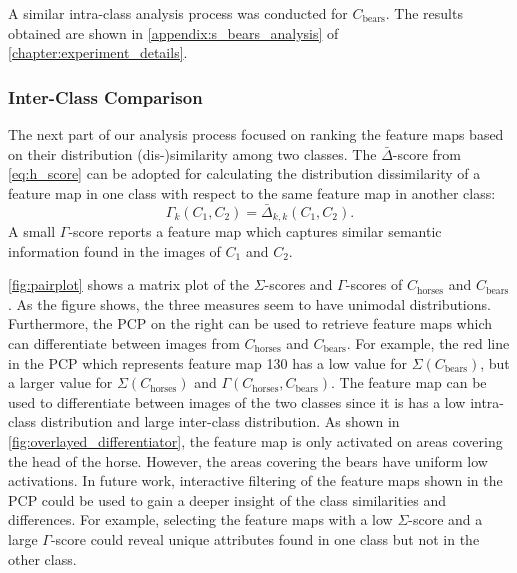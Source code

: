 A similar intra-class analysis process was conducted for $C_{\text{bears}}$. The results obtained are shown in \autoref{appendix:s_bears_analysis} of \autoref{chapter:experiment_details}.

\subsubsection{Inter-Class Comparison}

The next part of our analysis process focused on ranking the feature maps based on their distribution (dis-)similarity among two classes. The $\bar{\Delta}$-score from \autoref{eq:h_score} can be adopted for calculating the distribution dissimilarity of a feature map in one class with respect to the same feature map in another class:
\begin{equation}
    \Gamma_{k}(C_1, C_2) = \bar{\Delta}_{k, k}(C_1, C_2).
    \label{eq:F}
\end{equation}
A small $\Gamma$-score reports a feature map which captures similar semantic information found in the images of $C_1$ and $C_2$.

\autoref{fig:pairplot} shows a matrix plot of the $\Sigma$-scores and $\Gamma$-scores of $C_{\text{horses}}$ and $C_{\text{bears}}$. As the figure shows, the three measures seem to have unimodal distributions. Furthermore, the PCP on the right can be used to retrieve feature maps which can differentiate between images from $C_\text{horses}$ and $C_{\text{bears}}$. For example, the red line in the PCP which represents feature map 130 has a low value for $\Sigma(C_\text{bears})$, but a larger value for $\Sigma(C_\text{horses})$ and $\Gamma(C_{\text{horses}}, C_{\text{bears}})$. The feature map can be used to differentiate between images of the two classes since it is has a low intra-class distribution and large inter-class distribution. As shown in \autoref{fig:overlayed_differentiator}, the feature map is only activated on areas covering the head of the horse. However, the areas covering the bears have uniform low activations. In future work, interactive filtering of the feature maps shown in the PCP could be used to gain a deeper insight of the class similarities and differences. For example, selecting the feature maps with a low $\Sigma$-score and a large $\Gamma$-score could reveal unique attributes found in one class but not in the other class.

